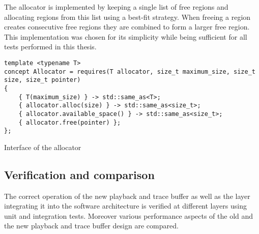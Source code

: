 The allocator is implemented by keeping a single list of free regions and allocating regions from this list using a best-fit strategy. When freeing a region creates consecutive free regions they are combined to form a larger free region. This implementation was chosen for its simplicity while being sufficient for all tests performed in this thesis.
\begin{listing}
\begin{verbatim}
template <typename T>
concept Allocator = requires(T allocator, size_t maximum_size, size_t size, size_t pointer)
{
	{ T(maximum_size) } -> std::same_as<T>;
	{ allocator.alloc(size) } -> std::same_as<size_t>;
	{ allocator.available_space() } -> std::same_as<size_t>;
	{ allocator.free(pointer) };
};
\end{verbatim}
\caption{Interface of the allocator}
\label{listing:allocator_interface}
\end{listing}

\subsection{Verification and comparison}
The correct operation of the new playback and trace buffer as well as the \ayo{} layer integrating it into the \BSSTwo{} software architecture is verified at different layers using unit and integration tests. Moreover various performance aspects of the old and the new playback and trace buffer design are compared.

